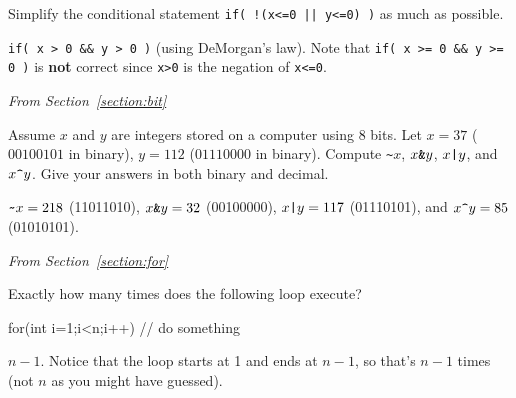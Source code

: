 
\begin{requ}
Simplify the conditional statement \verb+if( !(x<=0 || y<=0) )+ as much as possible.
\begin{requanswer}
\verb+if( x > 0 && y > 0 )+ (using DeMorgan's law). Note that 
\verb+if( x >= 0 && y >= 0 )+ is {\bf not} correct since \verb+x>0+ is the negation of \verb+x<=0+.
\end{requanswer}
\end{requ}


\medskip

\newpage

\noindent
{\em From Section~\ref{section:bit}}
\begin{requ}
Assume $x$ and $y$ are integers stored on a computer using 8 bits.
Let $x=37$ ($00100101$ in binary), $y=112$ ($01110000$ in binary).
Compute \verb+~+$x$, $x \verb+&+ y$, $x \verb+|+ y$, and $x \verb+^+ y$. Give your answers in both binary and decimal.
\begin{requanswer}
$\verb+~+x = 218$   (11011010), 
$x \verb+&+ y = 32$ (00100000),
$x \verb+|+ y = 117$ (01110101), and
$x \verb+^+ y = 85$ (01010101).
\end{requanswer}
\end{requ}

\medskip

\noindent
{\em From Section~\ref{section:for}}

\begin{requ}\label{simplefor}
Exactly how many times does the following loop execute?
\begin{code}
  for(int i=1;i<n;i++) {
     // do something
   }
\end{code}
\begin{requanswer}
$n-1$. Notice that the loop starts at 1 and ends at $n-1$, so that's $n-1$ times 
(not $n$ as you might have guessed).
\end{requanswer}
\end{requ}

